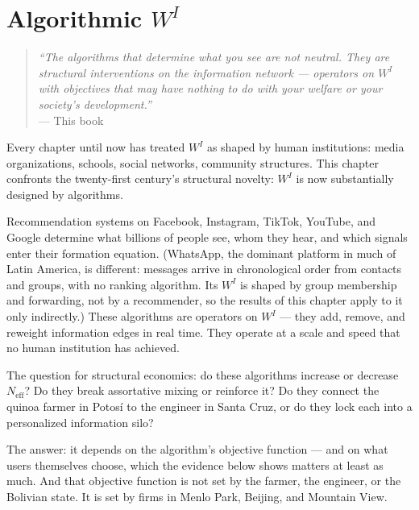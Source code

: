 \documentclass[../structural_economics_book.tex]{subfiles}
\begin{document}
\ifSubfilesClassLoaded{\setcounter{chapter}{26}}{}
\chapter{Algorithmic $W^I$}\label{ch:27}
\begin{quote}
\textit{``The algorithms that determine what you see are not neutral. They are structural interventions on the information network --- operators on $W^I$ with objectives that may have nothing to do with your welfare or your society's development.''}\\
\hfill --- This book
\end{quote}

\vspace{1em}

Every chapter until now has treated $W^I$ as shaped by human institutions: media organizations, schools, social networks, community structures. This chapter confronts the twenty-first century's structural novelty: $W^I$ is now substantially designed by algorithms.

Recommendation systems on Facebook, Instagram, TikTok, YouTube, and Google determine what billions of people see, whom they hear, and which signals enter their formation equation. (WhatsApp, the dominant platform in much of Latin America, is different: messages arrive in chronological order from contacts and groups, with no ranking algorithm. Its $W^I$ is shaped by group membership and forwarding, not by a recommender, so the results of this chapter apply to it only indirectly.) These algorithms are operators on $W^I$ --- they add, remove, and reweight information edges in real time. They operate at a scale and speed that no human institution has achieved.

The question for structural economics: do these algorithms increase or decrease $N_{\text{eff}}$? Do they break assortative mixing or reinforce it? Do they connect the quinoa farmer in Potos\'{i} to the engineer in Santa Cruz, or do they lock each into a personalized information silo?

The answer: it depends on the algorithm's objective function --- and on what users themselves choose, which the evidence below shows matters at least as much. And that objective function is not set by the farmer, the engineer, or the Bolivian state. It is set by firms in Menlo Park, Beijing, and Mountain View.
\end{document}
